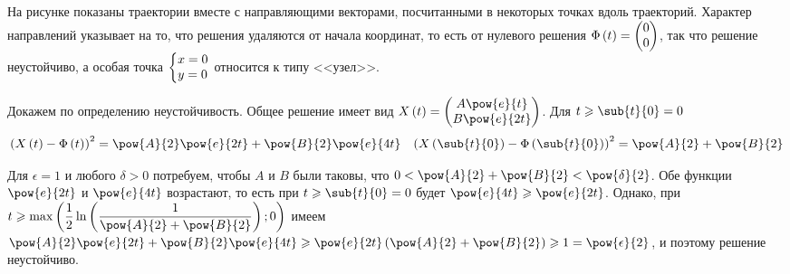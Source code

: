 \documentclass[a5paper,10pt]{article}
\begin{document}
На рисунке показаны траектории вместе с направляющими векторами, посчитанными в некоторых 
точках вдоль траекторий. Характер направлений указывает на то, что решения удаляются от 
начала координат, то есть от нулевого решения $\Phi\left(\hspace{0.01em}t\hspace{0.01em}\right) = \begin{pmatrix} 0 \\ 0 \end{pmatrix}$,
так что решение неустойчиво, а особая точка 
$\tsys{x = 0 \\ y = 0}$ относится к типу <<узел>>.

Докажем по определению неустойчивость. Общее решение имеет вид 
$X\br{t} = \begin{pmatrix} A \pow{e}{t} \\ B \pow{e}{2t} \end{pmatrix}$.
Для $t \ge \sub{t}{0} = 0$
\begin{align*}
    \br{X\br{t} - \Phi\br{t}}^2 = \pow{A}{2} \pow{e}{2t} + \pow{B}{2} \pow{e}{4t} &&
    \br{X\br{\sub{t}{0}} - \Phi\br{\sub{t}{0}}}^2 = \pow{A}{2} + \pow{B}{2}
\end{align*}
\vspace{1mm}

Для $\epsilon = 1$ и любого $\delta > 0$ потребуем, чтобы $A$ и $B$ были таковы, 
что $0 < \pow{A}{2} + \pow{B}{2} < \pow{\delta}{2}$. Обе функции 
$\pow{e}{2t}$ и $\pow{e}{4t}$ возрастают, то есть при $t \ge \sub{t}{0} = 0$ будет
$\pow{e}{4t} \ge \pow{e}{2t}$. Однако, при
$t \ge \max\br{ \dfrac {1} {2} \ln\br{\dfrac {1}{\pow{A}{2} + \pow{B}{2}}}; 0}$
имеем
$\pow{A}{2} \pow{e}{2t} + \pow{B}{2} \pow{e}{4t} 
    \ge \pow{e}{2t} \br{\pow{A}{2} + \pow{B}{2}} 
    \ge 1 
    = \pow{\epsilon}{2}$,
и поэтому \linebreak решение неустойчиво.
\end{document}
